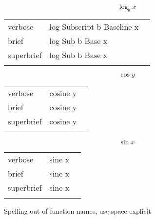 
\label{sec:functions}

\R
\E \[\log_bx\]
\begin{longtable}[c]{@{}lll@{}}
\toprule\addlinespace
verbose & log Subscript b Baseline x &

\\\addlinespace
brief & log Sub b Base x &

\\\addlinespace
superbrief & log Sub b Base x &

\\\addlinespace
\bottomrule
\end{longtable}


\E \[\cos y\]
\begin{longtable}[c]{@{}lll@{}}
\toprule\addlinespace
verbose & cosine y &

\\\addlinespace
brief & cosine y &

\\\addlinespace
superbrief & cosine y &

\\\addlinespace
\bottomrule
\end{longtable}


\E \[\sin x\]
\begin{longtable}[c]{@{}lll@{}}
\toprule\addlinespace
verbose & sine x &

\\\addlinespace
brief & sine x &

\\\addlinespace
superbrief & sine x &

\\\addlinespace
\bottomrule
\end{longtable}


\R
Spelling out of function names, use space explicit

